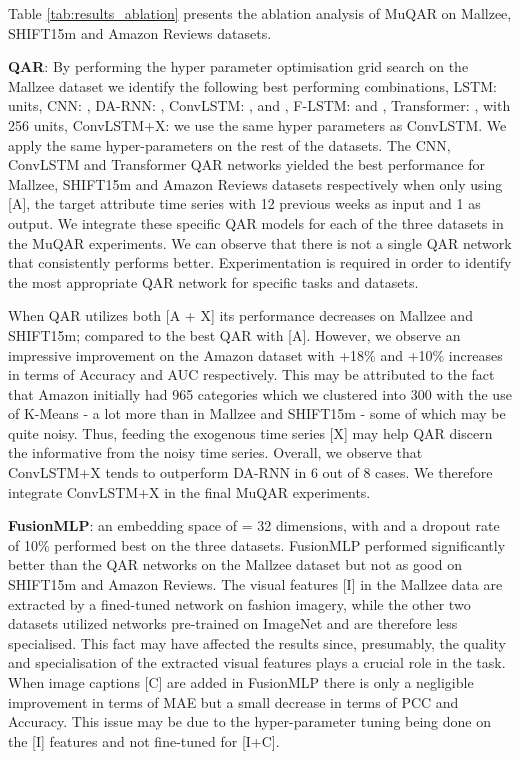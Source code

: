 \documentclass{article}
\begin{document}
Table \ref{tab:results_ablation} presents the ablation analysis of MuQAR on Mallzee, SHIFT15m and Amazon Reviews datasets. 

\textbf{QAR}: By performing the hyper parameter optimisation grid search on the Mallzee dataset we identify the following best performing combinations, LSTM:  units, CNN: , DA-RNN: , ConvLSTM: ,  and , F-LSTM:  and , Transformer: ,  with 256 units, ConvLSTM+X: we use the same hyper parameters as ConvLSTM.
We apply the same hyper-parameters on the rest of the datasets.
The CNN, ConvLSTM and Transformer QAR networks yielded the best performance for Mallzee, SHIFT15m and Amazon Reviews datasets respectively when only using [A], the target attribute time series with 12 previous weeks as input and 1 as output. 
We integrate these specific QAR models for each of the three datasets in the MuQAR experiments. We can observe that there is not a single QAR network that consistently performs better. Experimentation is required in order to identify the most appropriate QAR network for specific tasks and datasets.

When QAR utilizes both [A + X] its performance decreases on Mallzee and SHIFT15m; compared to the best QAR with [A].
However, we observe an impressive improvement on the Amazon dataset with +18\% and +10\% increases in terms of Accuracy and AUC respectively. 
This may be attributed to the fact that Amazon initially had 965 categories which we clustered into 300 with the use of K-Means - a lot more than in Mallzee and SHIFT15m - some of which may be quite noisy. Thus, feeding the exogenous time series [X] may help QAR discern the informative from the noisy time series.
Overall, we observe that ConvLSTM+X tends to outperform DA-RNN in 6 out of 8 cases. We therefore integrate ConvLSTM+X in the final MuQAR experiments.

\textbf{FusionMLP}: an embedding space of  = 32 dimensions,  with  and a dropout rate of 10\% performed best on the three datasets.
FusionMLP performed significantly better than the QAR networks on the Mallzee dataset but not as good on SHIFT15m and Amazon Reviews.
The visual features [I] in the Mallzee data are extracted by a fined-tuned network on fashion imagery, while the other two datasets utilized networks pre-trained on ImageNet and are therefore less specialised. This fact may have affected the results since, presumably, the quality and specialisation of the extracted visual features plays a crucial role in the task.
When image captions [C] are added in FusionMLP there is only a negligible improvement in terms of MAE but a small decrease in terms of PCC and Accuracy. This issue may be due to the hyper-parameter tuning being done on the [I] features and not fine-tuned for [I+C].
\end{document}
